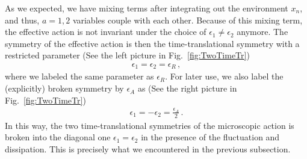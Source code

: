 \documentclass[a4paper,11pt]{article}
\begin{document}
As we expected, we have mixing terms after integrating out 
the environment $x_n$, and thus, $a=1,2$ variables couple with each other.
Because of this mixing term, 
the effective action is not invariant 
under the choice of $\epsilon_1 \neq \epsilon_2$ anymore. 
The symmetry of the effective action is then the time-translational symmetry 
with a restricted parameter 
(See the left picture in Fig.~\ref{fig:TwoTimeTr})
\begin{align}
\label{eR}
 \epsilon_1 = \epsilon_2 = \epsilon_R 
 \,,
\end{align}
where we labeled the same parameter as $\epsilon_R$. 
For later use, we also label the (explicitly) broken symmetry by $\epsilon_A$ as
(See the right picture in Fig.~\ref{fig:TwoTimeTr})
\begin{align}
\label{eA}
 \epsilon_1 = - \epsilon_2 = \frac{\epsilon_A}{2} \,.
\end{align}
In this way, the two time-translational symmetries of the microscopic action is broken into the diagonal one $\epsilon_1=\epsilon_2$ 
in the presence of the fluctuation and dissipation.
This is precisely what we encountered in the previous subsection.
\end{document}
